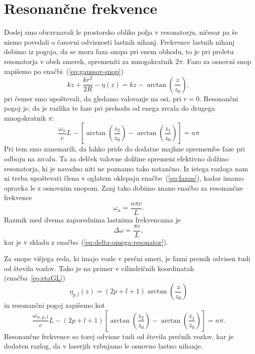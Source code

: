 \section{Resonančne frekvence}
Doslej smo obravnavali le prostorsko obliko polja v resonatorju, ničesar pa še nismo
povedali o časovni odvisnosti lastnih nihanj. Frekvence
lastnih nihanj dobimo iz pogoja, da se mora faza snopa pri enem obhodu,
to je pri preletu resonatorja v obeh smereh, spremeniti za mnogokratnik
$2\pi$. Fazo za osnovni snop zapišemo po enačbi~(\ref{eq:gaussov-snop})
\begin{equation}
kz+\frac{kr^{2}}{2R} -\eta(z) = kz-\arctan \left(\frac{z}{z_{0}}\right),
\label{eq:fazag}
\end{equation}
pri čemer smo upoštevali, da gledamo valovanje na osi, pri $r=0$. 
Resonančni pogoj je, da je razlika te faze pri prehodu od enega zrcala
do drugega mnogokratnik $\pi$: 
\begin{equation}
\frac{\omega_{n}}{c}L-\left[\arctan \left(\frac{z_{2}}{z_{0}}\right)-
\arctan\left(\frac{z_{1}}{z_{0}}\right)\right]=n\pi
\label{eq:fazan}
\end{equation}
Pri tem smo zanemarili, da lahko pride do dodatne majhne spremembe
faze pri odboju na zrcalu. Ta za delček valovne dolžine
spremeni efektivno dolžino resonatorja, ki je navadno niti ne poznamo
tako natančno. Iz istega razloga nam ni treba upoštevati člena
v oglatem oklepaju enačbe~(\ref{eq:fazan}), kadar imamo opravka le z osnovnim
snopom. Zanj tako dobimo znano enačbo za resonančne frekvence 
\begin{equation}
\omega_{n}=\frac{n\pi c}{L}.
\label{eq:omega}
\end{equation}
Razmik med dvema zaporednima lastnima frekvencama je 
\begin{equation}
\Delta\omega=\frac{\pi c}{L},
\label{eq:deltaomega}
\end{equation}
kar je v skladu z enačbo~(\ref{eq:delta-omega-resonator}). 

Za snope višjega reda, ki imajo vozle v prečni smeri, je fazni premik
odvisen tudi od števila vozlov. Tako je na primer v cilindričnih koordinatah
(enačba~\ref{eq:etaGL})
\begin{equation}
\eta_{p,l}(z)=(2p+l+1)\arctan\left(\frac{z}{z_{0}}\right)
\end{equation}
in resonančni pogoj zapišemo kot
\begin{equation}
\frac{\omega_{n,p,l}}{c}L-(2p+l+1)\left[\arctan\left(\frac{z_{2}}{z_{0}}\right)-
\arctan\left(\frac{z_{1}}{z_{0}}\right)\right]=n\pi.
\end{equation}
Resonančne frekvence so torej odvisne tudi od števila prečnih vozlov,
kar je dodaten razlog, da v laserjih vzbujamo le osnovno lastno nihanje.

